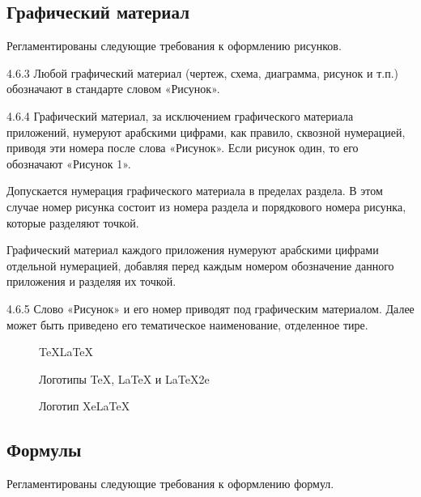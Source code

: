 \documentclass[12pt, twoside, final]{ruost}
\begin{document}
\begin{OST}
\begin{longtabu}{|X[l]|X[c]|X[c]|X[r]|}
					\end{longtabu}
				
			\subsection{Графический материал}\label{sec:figures}
			
				\point Регламентированы следующие требования к оформлению рисунков.
				
				\begin{stdquote}
					\par 4.6.3 Любой графический материал (чертеж, схема, диаграмма, рисунок и т.п.) обозначают в стандарте словом «Рисунок».
					\par 4.6.4 Графический материал, за исключением графического материала приложений, нумеруют арабскими цифрами, как правило, сквозной нумерацией, приводя эти номера после слова «Рисунок». Если рисунок один, то его обозначают «Рисунок 1».
					\par Допускается нумерация графического материала в пределах раздела. В этом случае номер рисунка состоит из номера раздела и порядкового номера рисунка, которые разделяют точкой. 
					\par Графический материал каждого приложения нумеруют арабскими цифрами отдельной нумерацией, добавляя перед каждым номером обозначение данного приложения и разделяя их точкой.
					\par 4.6.5 Слово «Рисунок» и его номер приводят под графическим материалом. Далее может быть приведено его тематическое наименование, отделенное тире.
					\par [ГОСТ 1.5---2001]
				\end{stdquote}
			
				\begin{figure}[H]
					\centering
					\LARGE\TeX\quad\LaTeX\quad\LaTeXe\\
					\caption{Логотипы TeX, LaTeX и LaTeX2e}
				\end{figure}
				
				\begin{figure}[H]
					\centering
					\LARGE\XeLaTeX
					\caption{Логотип XeLaTeX}
				\end{figure}
				
			\subsection{Формулы}\label{sec:equations}
			
				\point Регламентированы следующие требования к оформлению формул.
				

\end{OST}
\end{document}

